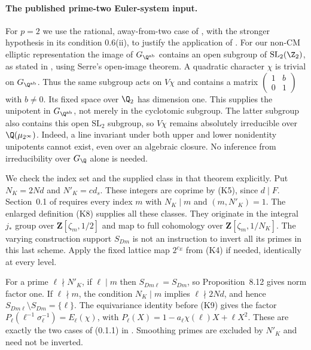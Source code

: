 \paragraph{The published prime-two Euler-system input.}
For $p=2$ we use the rational, away-from-two case of
\cite[Theorem 0.8, pp.~317--318]{kato1999}, with the stronger
hypothesis in its condition 0.6(ii), to justify the application of
\cite[Theorem 13.4(2)]{kato}. For our non-CM elliptic representation
the image of $G_{\Q^{\rm ab}}$ contains an open subgroup of
$\mathrm{SL}_2(\Z_2)$, as stated in
\cite[Example 0.6.2, pp.~317--318]{kato1999}, using Serre's open-image
theorem. A quadratic character $\chi$ is trivial on $G_{\Q^{\rm ab}}$.
Thus the same subgroup acts on $V\chi$ and contains a matrix
$\left(\begin{smallmatrix}1&b\\0&1\end{smallmatrix}\right)$ with
$b\ne0$. Its fixed space over $\Q_2$ has dimension one. This supplies
the unipotent in $G_{\Q^{\rm ab}}$, not merely in the cyclotomic
subgroup. The latter subgroup also contains this open
$\mathrm{SL}_2$ subgroup, so $V\chi$ remains absolutely irreducible
over $\Q(\mu_{2^\infty})$. Indeed, a line invariant under both upper
and lower nonidentity unipotents cannot exist, even over an algebraic
closure. No inference from irreducibility over $G_\Q$ alone is needed.

We check the index set and the supplied class in that theorem
explicitly. Put $N_K=2Nd$ and $N'_K=cd_s$. These integers are
coprime by (K5), since $d\mid F$. Section~0.1 of \cite{kato1999}
requires every index $m$ with $N_K\mid m$ and $(m,N'_K)=1$.
The enlarged definition (K8) supplies all these classes. They
originate in the integral $j_*$ group over
$\mathbf Z[\zeta_m,1/2]$ and map to full cohomology over
$\mathbf Z[\zeta_m,1/N_K]$. The varying construction support
$S_{Dm}$ is not an instruction to invert all its primes in this
last scheme. Apply the fixed lattice map $2^{c_E}$ from (K4) if
needed, identically at every level.

For a prime $\ell\nmid N'_K$, if $\ell\mid m$ then
$S_{Dm\ell}=S_{Dm}$, so Proposition~8.12 gives norm factor one.
If $\ell\nmid m$, the condition $N_K\mid m$ implies
$\ell\nmid2Nd$, and hence
$S_{Dm\ell}\setminus S_{Dm}=\{\ell\}$. The equivariance identity
before (K9) gives the factor
$P_\ell(\ell^{-1}\sigma_\ell^{-1})=E_\ell(\chi)$, with
$P_\ell(X)=1-a_\ell\chi(\ell)X+\ell X^2$. These are exactly the
two cases of (0.1.1) in \cite{kato1999}. Smoothing primes are
excluded by $N'_K$ and need not be inverted.

